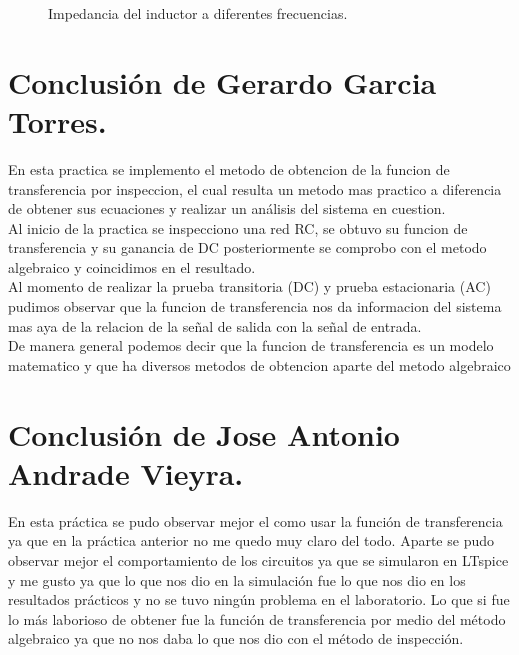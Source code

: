 \documentclass[12pt,a4paper]{article}
\newcounter{ns}
\begin{document}
	\begin{figure}[h!]
		\centering
		\caption{Impedancia del inductor a diferentes frecuencias.}
	\end{figure}

\newpage
\section{Conclusión de Gerardo Garcia Torres.}
En esta practica se implemento el metodo de obtencion de la funcion de transferencia por inspeccion, el cual resulta un metodo mas practico a diferencia de obtener sus ecuaciones y realizar un análisis del sistema en cuestion.\\[12pt]
Al inicio de la practica se inspecciono una red RC, se obtuvo su funcion de transferencia y su ganancia de DC posteriormente se comprobo con el metodo algebraico y coincidimos en el resultado.\\[12pt]
Al momento de realizar la prueba transitoria (DC) y prueba estacionaria (AC) pudimos observar que la funcion de transferencia nos da informacion del sistema mas aya de la relacion de la señal de salida con la señal de entrada.\\[12pt]
De manera general podemos decir que la funcion de transferencia es un modelo matematico y que ha diversos metodos de obtencion aparte del metodo algebraico
\section{Conclusión de Jose Antonio Andrade Vieyra.}
En esta práctica se pudo observar mejor el como usar la función de transferencia ya que en la práctica anterior no me quedo muy claro del todo. Aparte se pudo observar mejor el comportamiento de los circuitos ya que se simularon en LTspice y me gusto ya que lo que nos dio en la simulación fue lo que nos dio en los resultados prácticos y no se tuvo ningún problema en el laboratorio. Lo que si fue lo más laborioso de obtener fue la función de transferencia por medio del método algebraico ya que no nos daba lo que nos dio con el método de inspección. 
\end{document}

